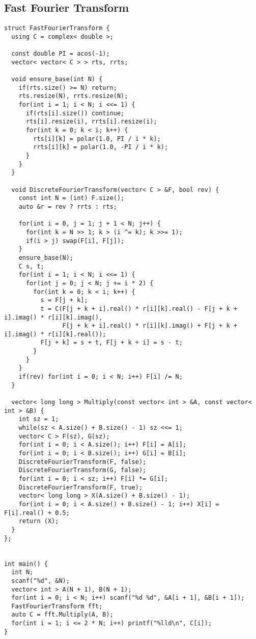 \documentclass[10pt]{article}
\begin{document}
\subsection{Fast Fourier Transform}
\begin{lstlisting}
struct FastFourierTransform {
  using C = complex< double >;

  const double PI = acos(-1);
  vector< vector< C > > rts, rrts;

  void ensure_base(int N) {
    if(rts.size() >= N) return;
    rts.resize(N), rrts.resize(N);
    for(int i = 1; i < N; i <<= 1) {
      if(rts[i].size()) continue;
      rts[i].resize(i), rrts[i].resize(i);
      for(int k = 0; k < i; k++) {
        rts[i][k] = polar(1.0, PI / i * k);
        rrts[i][k] = polar(1.0, -PI / i * k);
      }
    }
  }

  void DiscreteFourierTransform(vector< C > &F, bool rev) {
    const int N = (int) F.size();
    auto &r = rev ? rrts : rts;

    for(int i = 0, j = 1; j + 1 < N; j++) {
      for(int k = N >> 1; k > (i ^= k); k >>= 1);
      if(i > j) swap(F[i], F[j]);
    }
    ensure_base(N);
    C s, t;
    for(int i = 1; i < N; i <<= 1) {
      for(int j = 0; j < N; j += i * 2) {
        for(int k = 0; k < i; k++) {
          s = F[j + k];
          t = C(F[j + k + i].real() * r[i][k].real() - F[j + k + i].imag() * r[i][k].imag(),
                F[j + k + i].real() * r[i][k].imag() + F[j + k + i].imag() * r[i][k].real());
          F[j + k] = s + t, F[j + k + i] = s - t;
        }
      }
    }
    if(rev) for(int i = 0; i < N; i++) F[i] /= N;
  }

  vector< long long > Multiply(const vector< int > &A, const vector< int > &B) {
    int sz = 1;
    while(sz < A.size() + B.size() - 1) sz <<= 1;
    vector< C > F(sz), G(sz);
    for(int i = 0; i < A.size(); i++) F[i] = A[i];
    for(int i = 0; i < B.size(); i++) G[i] = B[i];
    DiscreteFourierTransform(F, false);
    DiscreteFourierTransform(G, false);
    for(int i = 0; i < sz; i++) F[i] *= G[i];
    DiscreteFourierTransform(F, true);
    vector< long long > X(A.size() + B.size() - 1);
    for(int i = 0; i < A.size() + B.size() - 1; i++) X[i] = F[i].real() + 0.5;
    return (X);
  }
};


int main() {
  int N;
  scanf("%d", &N);
  vector< int > A(N + 1), B(N + 1);
  for(int i = 0; i < N; i++) scanf("%d %d", &A[i + 1], &B[i + 1]);
  FastFourierTransform fft;
  auto C = fft.Multiply(A, B);
  for(int i = 1; i <= 2 * N; i++) printf("%lld\n", C[i]);
}
\end{lstlisting}
\end{document}
